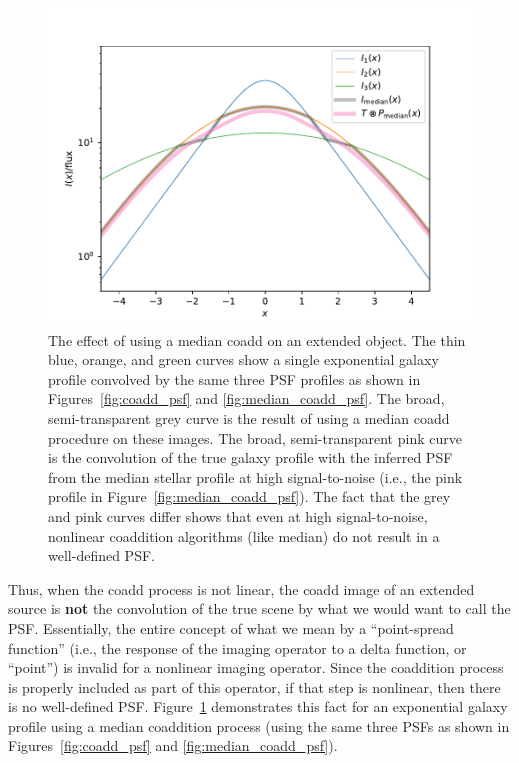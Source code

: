 \documentclass{openjournal}
\newcommand{\irresponse}[1]{{#1}}
\begin{document}
\begin{figure}
\begin{center}
\includegraphics[width=5in]{figures/extended.pdf}
 \caption{The effect of using a median coadd on an extended object. 
 The thin blue, orange, and green curves show a single exponential galaxy profile convolved by the 
 same three PSF profiles as shown in Figures~\ref{fig:coadd_psf} and \ref{fig:median_coadd_psf}. The \irresponse{broad, semi-transparent grey} curve is the result
 of using a median coadd procedure on these images.  The \irresponse{broad, semi-transparent} pink curve is the convolution of the true
 galaxy profile with the inferred PSF from the \irresponse{median} stellar profile at high signal-to-noise (i.e., the pink profile in Figure~\ref{fig:median_coadd_psf}).  The fact that the
 \irresponse{grey} and pink curves differ shows that even at high signal-to-noise, nonlinear coaddition algorithms
 (like median) do not result in a well-defined PSF.} \label{fig:extended}
\end{center}
 \end{figure}

Thus, when the coadd process is not linear,
the coadd image of an extended source is {\bf not} the convolution of the true scene by what
we would want to call the PSF.
Essentially, the entire concept of what we mean by a ``point-spread function'' (i.e., the response
of the imaging operator to a delta function, or ``point'') is invalid for a nonlinear imaging operator.  
Since the coaddition process is properly included as part of this operator, if that
step is nonlinear, then there is no well-defined PSF. 
Figure~\ref{fig:extended} demonstrates this fact for an exponential galaxy profile using a median
coaddition process (using the same three PSFs as shown in Figures~\ref{fig:coadd_psf} and \ref{fig:median_coadd_psf}).
\end{document}

